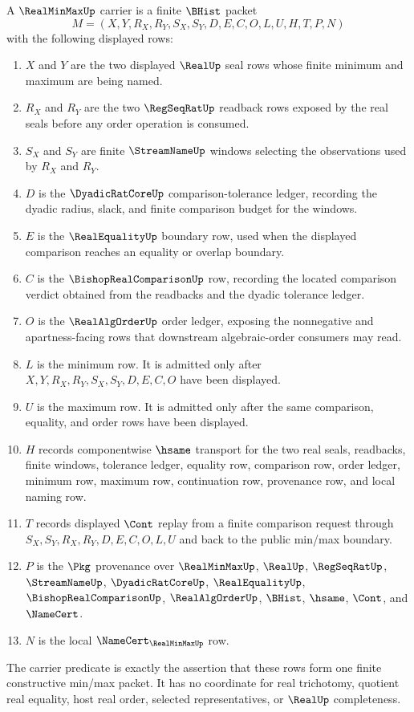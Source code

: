 \begin{definition}
\label{def:real-min-max-carrier}
A $\RealMinMaxUp$ carrier is a finite $\BHist$ packet
$$
M=(X,Y,R_X,R_Y,S_X,S_Y,D,E,C,O,L,U,H,T,P,N)
$$
with the following displayed rows:
\begin{enumerate}
\item $X$ and $Y$ are the two displayed $\RealUp$ seal rows whose finite minimum and maximum are being named.
\item $R_X$ and $R_Y$ are the two $\RegSeqRatUp$ readback rows exposed by the real seals before any order operation is consumed.
\item $S_X$ and $S_Y$ are finite $\StreamNameUp$ windows selecting the observations used by $R_X$ and $R_Y$.
\item $D$ is the $\DyadicRatCoreUp$ comparison-tolerance ledger, recording the dyadic radius, slack, and finite comparison budget for the windows.
\item $E$ is the $\RealEqualityUp$ boundary row, used when the displayed comparison reaches an equality or overlap boundary.
\item $C$ is the $\BishopRealComparisonUp$ row, recording the located comparison verdict obtained from the readbacks and the dyadic tolerance ledger.
\item $O$ is the $\RealAlgOrderUp$ order ledger, exposing the nonnegative and apartness-facing rows that downstream algebraic-order consumers may read.
\item $L$ is the minimum row. It is admitted only after $X,Y,R_X,R_Y,S_X,S_Y,D,E,C,O$ have been displayed.
\item $U$ is the maximum row. It is admitted only after the same comparison, equality, and order rows have been displayed.
\item $H$ records componentwise $\hsame$ transport for the two real seals, readbacks, finite windows, tolerance ledger, equality row, comparison row, order ledger, minimum row, maximum row, continuation row, provenance row, and local naming row.
\item $T$ records displayed $\Cont$ replay from a finite comparison request through $S_X,S_Y,R_X,R_Y,D,E,C,O,L,U$ and back to the public min/max boundary.
\item $P$ is the $\Pkg$ provenance over $\RealMinMaxUp$, $\RealUp$, $\RegSeqRatUp$, $\StreamNameUp$, $\DyadicRatCoreUp$, $\RealEqualityUp$, $\BishopRealComparisonUp$, $\RealAlgOrderUp$, $\BHist$, $\hsame$, $\Cont$, and $\NameCert$.
\item $N$ is the local $\NameCert_{\RealMinMaxUp}$ row.
\end{enumerate}
The carrier predicate is exactly the assertion that these rows form one finite constructive min/max packet. It has no coordinate for real trichotomy, quotient real equality, host real order, selected representatives, or $\RealUp$ completeness.
\end{definition}

